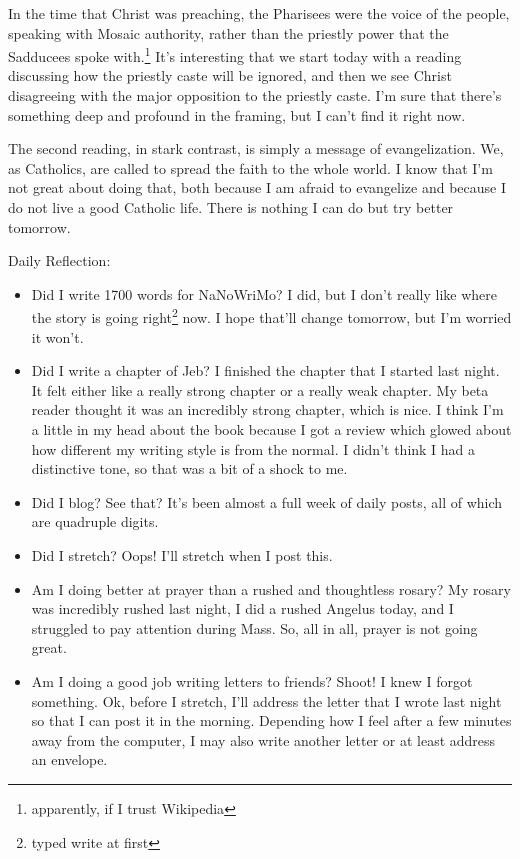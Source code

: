 \documentclass[12pt]{article}[titlepage]
\newcommand{\1}{\={a}}
\newcommand{\2}{\={e}}
\newcommand{\3}{\={\i}}
\newcommand{\4}{\=o}
\newcommand{\5}{\=u}
\newcommand{\6}{\={A}}
\renewcommand{\,}{\textsuperscript{,}}
\begin{document}
In the time that Christ was preaching, the Pharisees were the voice of the people, speaking with Mosaic authority, rather than the priestly power that the Sadducees spoke with.\footnote{apparently, if I trust Wikipedia}
It's interesting that we start today with a reading discussing how the priestly caste will be ignored, and then we see Christ disagreeing with the major opposition to the priestly caste.
I'm sure that there's something deep and profound in the framing, but I can't find it right now.

The second reading, in stark contrast, is simply a message of evangelization.
We, as Catholics, are called to spread the faith to the whole world.
I know that I'm not great about doing that, both because I am afraid to evangelize and because I do not live a good Catholic life.
There is nothing I can do but try better tomorrow.

Daily Reflection:
\begin{itemize}
\item Did I write 1700 words for NaNoWriMo? I did, but I don't really like where the story is going right\footnote{typed write at first} now.
I hope that'll change tomorrow, but I'm worried it won't.
\item Did I write a chapter of Jeb? I finished the chapter that I started last night.
It felt either like a really strong chapter or a really weak chapter.
My beta reader thought it was an incredibly strong chapter, which is nice.
I think I'm a little in my head about the book because I got a review which glowed about how different my writing style is from the normal.
I didn't think I had a distinctive tone, so that was a bit of a shock to me.
\item Did I blog? See that? It's been almost a full week of daily posts, all of which are quadruple digits.
\item Did I stretch? Oops! I'll stretch when I post this.
\item Am I doing better at prayer than a rushed and thoughtless rosary? My rosary was incredibly rushed last night, I did a rushed Angelus today, and I struggled to pay attention during Mass. So, all in all, prayer is not going great.
\item Am I doing a good job writing letters to friends? Shoot! I knew I forgot something.
Ok, before I stretch, I'll address the letter that I wrote last night so that I can post it in the morning.
Depending how I feel after a few minutes away from the computer, I may also write another letter or at least address an envelope.
\end{itemize}
\end{document}
